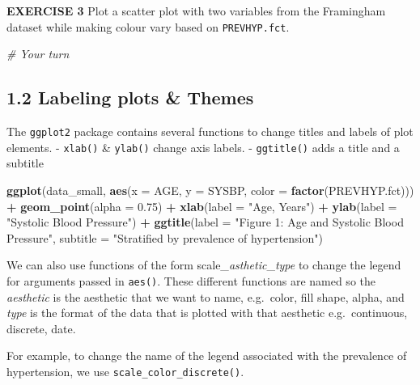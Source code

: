 \documentclass[
]{article}
\newenvironment{Shaded}{\begin{snugshade}}{\end{snugshade}}
\newcommand{\CommentTok}[1]{\textcolor[rgb]{0.56,0.35,0.01}{\textit{#1}}}
\newcommand{\DataTypeTok}[1]{\textcolor[rgb]{0.13,0.29,0.53}{#1}}
\newcommand{\FloatTok}[1]{\textcolor[rgb]{0.00,0.00,0.81}{#1}}
\newcommand{\KeywordTok}[1]{\textcolor[rgb]{0.13,0.29,0.53}{\textbf{#1}}}
\newcommand{\NormalTok}[1]{#1}
\newcommand{\OperatorTok}[1]{\textcolor[rgb]{0.81,0.36,0.00}{\textbf{#1}}}
\newcommand{\StringTok}[1]{\textcolor[rgb]{0.31,0.60,0.02}{#1}}
\begin{document}
\textbf{EXERCISE 3} Plot a scatter plot with two variables from the
Framingham dataset while making colour vary based on
\texttt{PREVHYP.fct}.

\begin{Shaded}
\begin{Highlighting}[]
\CommentTok{# Your turn}
\end{Highlighting}
\end{Shaded}

\hypertarget{labeling-plots-themes}{%
\subsection{1.2 Labeling plots \& Themes}\label{labeling-plots-themes}}

The \texttt{ggplot2} package contains several functions to change titles
and labels of plot elements. - \texttt{xlab()} \& \texttt{ylab()} change
axis labels. - \texttt{ggtitle()} adds a title and a subtitle

\begin{Shaded}
\begin{Highlighting}[]
\KeywordTok{ggplot}\NormalTok{(data_small, }
      \KeywordTok{aes}\NormalTok{(}\DataTypeTok{x =}\NormalTok{ AGE, }\DataTypeTok{y =}\NormalTok{ SYSBP, }\DataTypeTok{color =} \KeywordTok{factor}\NormalTok{(PREVHYP.fct))) }\OperatorTok{+}
\StringTok{  }\KeywordTok{geom_point}\NormalTok{(}\DataTypeTok{alpha =} \FloatTok{0.75}\NormalTok{) }\OperatorTok{+}
\StringTok{  }\KeywordTok{xlab}\NormalTok{(}\DataTypeTok{label =} \StringTok{"Age, Years"}\NormalTok{) }\OperatorTok{+}\StringTok{ }
\StringTok{  }\KeywordTok{ylab}\NormalTok{(}\DataTypeTok{label =} \StringTok{"Systolic Blood Pressure"}\NormalTok{) }\OperatorTok{+}
\StringTok{  }\KeywordTok{ggtitle}\NormalTok{(}\DataTypeTok{label =} \StringTok{"Figure 1: Age and Systolic Blood Pressure"}\NormalTok{, }
          \DataTypeTok{subtitle =} \StringTok{"Stratified by prevalence of hypertension"}\NormalTok{) }
\end{Highlighting}
\end{Shaded}

We can also use functions of the form
scale\_\emph{asthetic}\_\emph{type} to change the legend for arguments
passed in \texttt{aes()}. These different functions are named so the
\emph{aesthetic} is the aesthetic that we want to name, e.g.~color, fill
shape, alpha, and \emph{type} is the format of the data that is plotted
with that aesthetic e.g.~continuous, discrete, date.

For example, to change the name of the legend associated with the
prevalence of hypertension, we use \texttt{scale\_color\_discrete()}.
\end{document}
